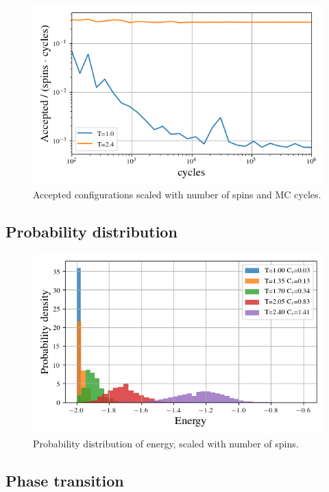 \begin{figure}[H]
  \centering
  \includegraphics[width=\textwidth]{../figures/accepted.png}
  \caption{Accepted configurations scaled with number of spins and MC cycles.}
  \label{fig:accepted}
\end{figure}


\subsection{Probability distribution}

\begin{figure}[H]
  \centering
  \includegraphics[width=\textwidth]{../figures/distribution.png}
  \caption{Probability distribution of energy, scaled with number of spins.}
  \label{fig:distribution}
\end{figure}




\subsection{Phase transition}

